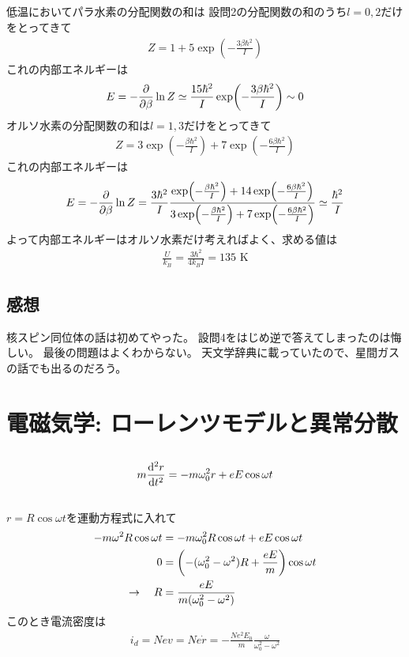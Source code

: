 \documentclass[../../master.tex]{subfiles}
\begin{document}
\subsection{}
低温においてパラ水素の分配関数の和は
設問2の分配関数の和のうち\(l=0,2\)だけをとってきて
\begin{align}
    Z = 1 +5\exp(-\frac{3\beta\hbar^2}{I})
\end{align}
これの内部エネルギーは
\begin{align}
    E = -\pdv{\beta}\ln Z \simeq \frac{15\hbar^2}{I}\exp(-\frac{3\beta\hbar^2}{I})\sim 0
\end{align}
オルソ水素の分配関数の和は\(l=1,3\)だけをとってきて
\begin{align}
    Z = 3\exp(-\frac{\beta\hbar^2}{I}) +7\exp(-\frac{6\beta\hbar^2}{I})
\end{align}
これの内部エネルギーは
\begin{align}
    E = -\pdv{\beta}\ln Z
    = \frac{3\hbar^2}{I}\dfrac{\exp(-\frac{\beta\hbar^2}{I}) +14\exp(-\frac{6\beta\hbar^2}{I})}{3\exp(-\frac{\beta\hbar^2}{I}) +7\exp(-\frac{6\beta\hbar^2}{I})}
    \simeq \frac{\hbar^2 }{I}
\end{align}
よって内部エネルギーはオルソ水素だけ考えればよく、求める値は
\begin{align}
    \frac{U}{k_B} = \frac{3\hbar^2}{4k_BI} = 135 \text{ K}
\end{align}

\subsection*{感想}
核スピン同位体の話は初めてやった。
設問4をはじめ逆で答えてしまったのは悔しい。
最後の問題はよくわからない。
天文学辞典に載っていたので、星間ガスの話でも出るのだろう。

\clearpage
\section{電磁気学: ローレンツモデルと異常分散}
\subsection{}
\begin{align}
    m\dv[2]{r}{t} = -m\omega_0^2r +eE\cos\omega t
\end{align}
\subsection{}
\(r=R\cos\omega t\)を運動方程式に入れて
\begin{align}
    -m\omega^2 R\cos\omega t &= -m\omega_0^2 R\cos\omega t + eE\cos\omega t\\
    0 &= \qty(-(\omega_0^2-\omega^2)R+\frac{eE}{m})\cos\omega t\\
    \rightarrow \quad R &=\frac{eE}{m(\omega_0^2-\omega^2)}
\end{align}
このとき電流密度は
\begin{align}
    i_d = Nev = Ne\dot{r} = -\frac{Ne^2E_0}{m}\frac{\omega}{\omega_0^2-\omega^2}
\end{align}
\end{document}
